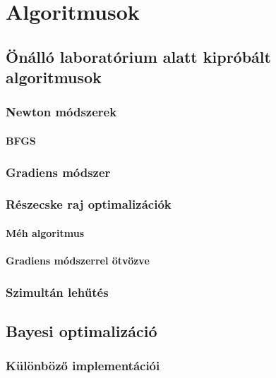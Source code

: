 \chapter{Algoritmusok}
\label{sec:algoritmusok}

\section{Önálló laboratórium alatt kipróbált algoritmusok}

\subsection{Newton módszerek}
\subsubsection{BFGS}
\subsection{Gradiens módszer}
\subsection{Részecske raj optimalizációk}
\subsubsection{Méh algoritmus}
\subsubsection{Gradiens módszerrel ötvözve}
\subsection{Szimultán lehűtés}


\section{Bayesi optimalizáció}
\subsection{Különböző implementációi}

